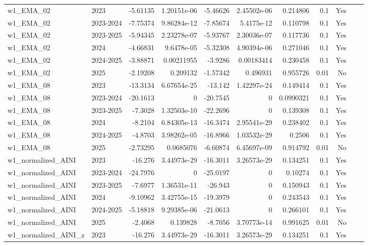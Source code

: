 \begin{longtable}{llrrrrrrrrl}
w1\_EMA\_02 & 2023 & -5.61135 & 1.20151e-06 & -5.46626 & 2.45502e-06 & 0.214806 & 0.1 & Yes &  \\
w1\_EMA\_02 & 2023-2024 & -7.75374 & 9.86284e-12 & -7.85674 & 5.4175e-12 & 0.110798 & 0.1 & Yes &  \\
w1\_EMA\_02 & 2023-2025 & -5.94345 & 2.23278e-07 & -5.93767 & 2.30036e-07 & 0.117736 & 0.1 & Yes &  \\
w1\_EMA\_02 & 2024 & -4.66831 & 9.6478e-05 & -5.32308 & 4.90394e-06 & 0.271046 & 0.1 & Yes &  \\
w1\_EMA\_02 & 2024-2025 & -3.88871 & 0.00211955 & -3.9286 & 0.00183414 & 0.230458 & 0.1 & Yes &  \\
w1\_EMA\_02 & 2025 & -2.19208 & 0.209132 & -1.57342 & 0.496931 & 0.955726 & 0.01 & No &  \\
w1\_EMA\_08 & 2023 & -13.3134 & 6.67654e-25 & -13.142 & 1.42297e-24 & 0.149414 & 0.1 & Yes &  \\
w1\_EMA\_08 & 2023-2024 & -20.1613 & 0 & -20.7545 & 0 & 0.0990321 & 0.1 & Yes &  \\
w1\_EMA\_08 & 2023-2025 & -7.3028 & 1.32503e-10 & -22.2696 & 0 & 0.139308 & 0.1 & Yes &  \\
w1\_EMA\_08 & 2024 & -8.2104 & 6.84305e-13 & -16.3474 & 2.95541e-29 & 0.238402 & 0.1 & Yes &  \\
w1\_EMA\_08 & 2024-2025 & -4.8703 & 3.98262e-05 & -16.8966 & 1.03532e-29 & 0.2506 & 0.1 & Yes &  \\
w1\_EMA\_08 & 2025 & -2.73295 & 0.0685076 & -6.60874 & 6.45697e-09 & 0.914792 & 0.01 & No &  \\
w1\_normalized\_AINI & 2023 & -16.276 & 3.44973e-29 & -16.3011 & 3.26573e-29 & 0.134251 & 0.1 & Yes &  \\
w1\_normalized\_AINI & 2023-2024 & -24.7976 & 0 & -25.0197 & 0 & 0.10274 & 0.1 & Yes &  \\
w1\_normalized\_AINI & 2023-2025 & -7.6977 & 1.36531e-11 & -26.943 & 0 & 0.150943 & 0.1 & Yes &  \\
w1\_normalized\_AINI & 2024 & -9.10962 & 3.42755e-15 & -19.3979 & 0 & 0.243543 & 0.1 & Yes &  \\
w1\_normalized\_AINI & 2024-2025 & -5.18818 & 9.29385e-06 & -21.0613 & 0 & 0.266101 & 0.1 & Yes &  \\
w1\_normalized\_AINI & 2025 & -2.4068 & 0.139828 & -8.7056 & 3.70773e-14 & 0.991625 & 0.01 & No &  \\
w1\_normalized\_AINI\_z & 2023 & -16.276 & 3.44973e-29 & -16.3011 & 3.26573e-29 & 0.134251 & 0.1 & Yes &  \\

\end{longtable}
